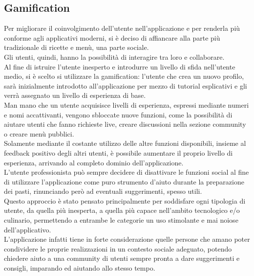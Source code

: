 \subsection{Gamification}
Per migliorare il coinvolgimento dell'utente nell'applicazione e per renderla più conforme agli applicativi moderni, si è deciso di affiancare alla parte più tradizionale di ricette e menù, una parte sociale.\\
Gli utenti, quindi, hanno la possibilità di interagire tra loro e collaborare.\\
Al fine di istruire l'utente inesperto e introdurre un livello di sfida nell'utente medio, si è scelto si utilizzare la gamification:
l'utente che crea un nuovo profilo, sarà inizialmente introdotto all'applicazione per mezzo di tutorial esplicativi e gli verrà assegnato un livello di esperienza di base.\\
Man mano che un utente acquisisce livelli di esperienza, espressi mediante numeri e nomi accattivanti, vengono sbloccate nuove funzioni, come la possibilità di aiutare utenti che fanno richieste live, creare discussioni nella sezione community o creare menù pubblici.\\
Solamente mediante il costante utilizzo delle altre funzioni disponibili, insieme al feedback positivo degli altri utenti, è possibile aumentare il proprio livello di esperienza, arrivando al completo dominio dell'applicazione.\\
L'utente professionista può sempre decidere di disattivare le funzioni social al fine di utilizzare l'applicazione come puro strumento d'aiuto durante la preparazione dei pasti, rinunciando però ad eventuali suggerimenti, spesso utili.\\
Questo approccio è stato pensato principalmente per soddisfare ogni tipologia di utente, da quella più inesperta, a quella più capace nell'ambito tecnologico e/o culinario, permettendo a entrambe le categorie un uso stimolante e mai noiose dell'applicativo.\\
L’applicazione infatti tiene in forte considerazione quelle persone che amano poter condividere le proprie realizzazioni in un contesto sociale adeguato, potendo chiedere aiuto a una community di utenti sempre pronta a dare suggerimenti e consigli, imparando ed aiutando allo stesso tempo.

